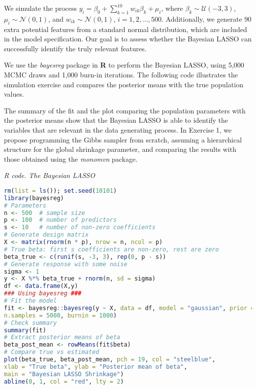 We simulate the process \( y_i = \beta_0 + \sum_{k=1}^{10} w_{ik} \beta_k + \mu_i \), where \( \beta_k \sim \mathcal{U}(-3, 3) \), \( \mu_i \sim \mathcal{N}(0, 1) \), and \( w_{ik} \sim \mathcal{N}(0, 1) \), $i=1,2,\dots,500$. Additionally, we generate 90 extra potential features from a standard normal distribution, which are included in the model specification. Our goal is to assess whether the Bayesian LASSO can successfully identify the truly relevant features.

We use the \textit{bayesreg} package in \textbf{R} to perform the Bayesian LASSO, using 5,000 MCMC draws and 1,000 burn-in iterations. The following code illustrates the simulation exercise and compares the posterior means with the true population values.

The summary of the fit and the plot comparing the population parameters with the posterior means show that the Bayesian LASSO is able to identify the variables that are relevant in the data generating process. In Exercise 1, we propose programming the Gibbs sampler from scratch, assuming a hierarchical structure for the global shrinkage parameter, and comparing the results with those obtained using the \textit{monomvn} package.

\begin{tcolorbox}[enhanced,width=4.67in,center upper,
	fontupper=\large\bfseries,drop shadow southwest,sharp corners]
	\textit{R code. The Bayesian LASSO}
	\begin{VF}
		\begin{lstlisting}[language=R]
rm(list = ls()); set.seed(10101)
library(bayesreg)
# Parameters
n <- 500  # sample size
p <- 100  # number of predictors
s <- 10   # number of non-zero coefficients
# Generate design matrix
X <- matrix(rnorm(n * p), nrow = n, ncol = p)
# True beta: first s coefficients are non-zero, rest are zero
beta_true <- c(runif(s, -3, 3), rep(0, p - s))
# Generate response with some noise
sigma <- 1
y <- X %*% beta_true + rnorm(n, sd = sigma)
df <- data.frame(X,y)
### Using bayesreg ###
# Fit the model
fit <- bayesreg::bayesreg(y ~ X, data = df, model = "gaussian", prior = "lasso", 
n.samples = 5000, burnin = 1000)
# Check summary
summary(fit)
# Extract posterior means of beta
beta_post_mean <- rowMeans(fit$beta)
# Compare true vs estimated
plot(beta_true, beta_post_mean, pch = 19, col = "steelblue",
xlab = "True beta", ylab = "Posterior mean of beta",
main = "Bayesian LASSO Shrinkage")
abline(0, 1, col = "red", lty = 2)
\end{lstlisting}
	\end{VF}
\end{tcolorbox}
  
